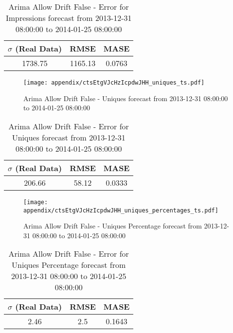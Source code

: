 \begin{table}[H]
\centering
\footnotesize
\begin{tabular}{ccc}
$\sigma$ (Real Data) & RMSE & MASE   \\ \hline
1738.75 & 1165.13 & 0.0763 \\
\end{tabular}

\vspace{0.5cm}

\caption{
Arima Allow Drift False - Error for Impressions forecast from 2013-12-31 08:00:00 to 2014-01-25 08:00:00}
\end{table}

\begin{figure}[H] \begin{center} \leavevmode
\texttt{[image: appendix/ctsEtgVJcHzIcpdwJHH\_uniques\_ts.pdf]} \caption{
Arima Allow Drift False - Uniques forecast from 2013-12-31 08:00:00 to 2014-01-25 08:00:00} \label{fig:appendix/ctsEtgVJcHzIcpdwJHH_uniques_ts.pdf} \end{center}
\end{figure}

\begin{table}[H]
\centering
\footnotesize
\begin{tabular}{ccc}
$\sigma$ (Real Data) & RMSE & MASE   \\ \hline
206.66 & 58.12 & 0.0333 \\
\end{tabular}

\vspace{0.5cm}

\caption{
Arima Allow Drift False - Error for Uniques forecast from 2013-12-31 08:00:00 to 2014-01-25 08:00:00}
\end{table}

\begin{figure}[H] \begin{center} \leavevmode
\texttt{[image: appendix/ctsEtgVJcHzIcpdwJHH\_uniques\_percentages\_ts.pdf]} \caption{
Arima Allow Drift False - Uniques Percentage forecast from 2013-12-31 08:00:00 to 2014-01-25 08:00:00} \label{fig:appendix/ctsEtgVJcHzIcpdwJHH_uniques_percentages_ts.pdf} \end{center}
\end{figure}

\begin{table}[H]
\centering
\footnotesize
\begin{tabular}{ccc}
$\sigma$ (Real Data) & RMSE & MASE   \\ \hline
2.46 & 2.5 & 0.1643 \\
\end{tabular}

\vspace{0.5cm}

\caption{
Arima Allow Drift False - Error for Uniques Percentage forecast from 2013-12-31 08:00:00 to 2014-01-25 08:00:00}
\end{table}

